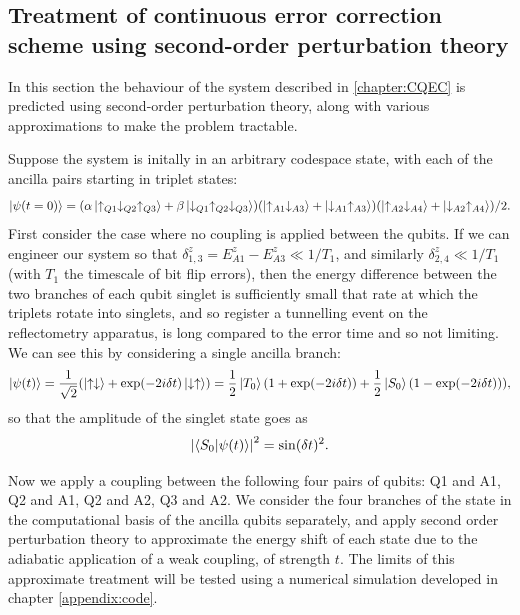 \documentclass{report}
\begin{document}
\begin{appendices}
\chapter{Treatment of continuous error correction scheme using second-order perturbation theory}\label{appendix:perturbationtheory}

In this section the behaviour of the system described in \ref{chapter:CQEC} is predicted using second-order perturbation theory, along with various approximations to make the problem tractable. 

Suppose the system is initally in an arbitrary codespace state, with each of the ancilla pairs starting in triplet states:
\begin{equation*}
    \ket{\psi(t = 0)} = (\alpha\ket{\uparrow_{Q1}\downarrow_{Q2}\uparrow_{Q3}} + \beta\ket{\downarrow_{Q1}\uparrow_{Q2}\downarrow_{Q3}})(\ket{\uparrow_{A1}\downarrow_{A3}} + \ket{\downarrow_{A1}\uparrow_{A3}})(\ket{\uparrow_{A2}\downarrow_{A4}} + \ket{\downarrow_{A2}\uparrow_{A4}}) / 2.
\end{equation*}
First consider the case where no coupling is applied between the qubits. If we can engineer our system so that $\delta_{1,3}^z = E_{A1}^z - E_{A3}^z \ll 1/T_1$, and similarly $\delta_{2,4}^z \ll 1/T_1$ (with $T_1$ the timescale of bit flip errors), then the energy difference between the two branches of each qubit singlet is sufficiently small that rate at which the triplets rotate into singlets, and so register a tunnelling event on the reflectometry apparatus, is long compared to the error time and so not limiting. We can see this by considering a single ancilla branch:
\begin{equation}
    \ket{\psi(t)} = \frac{1}{\sqrt{2}}(\ket{\uparrow\downarrow} + \exp(-2i\delta t)\ket{\downarrow\uparrow}) = \frac{1}{2}\ket{T_0}(1 + \exp(-2i\delta t)) + \frac{1}{2}\ket{S_0}(1 - \exp(-2i\delta t))),
\end{equation} \label{eq:triplet_to_singlet} so that the amplitude of the singlet state goes as 
\begin{equation*}
    \left|\braket{S_0|\psi(t)}\right|^2 = \sin(\delta t)^2.
\end{equation*}

Now we apply a coupling between the following four pairs of qubits: Q1 and A1, Q2 and A1, Q2 and A2, Q3 and A2. We consider the four branches of the state in the computational basis of the ancilla qubits separately, and apply second order perturbation theory to approximate the energy shift of each state due to the adiabatic application of a weak coupling, of strength $t$. The limits of this approximate treatment will be tested using a numerical simulation developed in chapter \ref{appendix:code}.


\end{appendices}
\end{document}
